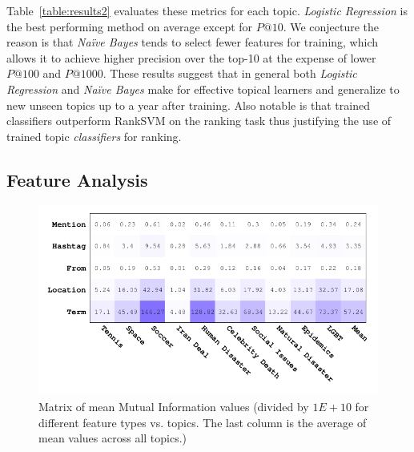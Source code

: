 \documentclass[letterpaper]{article}
\begin{document}
Table~\ref{table:results2} evaluates these metrics for each
topic. \textit{Logistic Regression} is the best performing
method on average except for $P@10$.  We conjecture the reason
is that \textit{Na\"{i}ve Bayes} tends to select fewer
features for training, which allows it to achieve higher precision
over the top-10 at the expense of lower $P@100$ and $P@1000$.
These results suggest that in general both \textit{Logistic Regression} 
and \textit{Na\"{i}ve Bayes} make for effective topical 
learners %
and generalize to new unseen topics up to a year after training.
Also notable is that 
trained classifiers outperform RankSVM on the ranking task thus justifying
the use of trained topic \emph{classifiers} for ranking.


\subsection{Feature Analysis}
\label{label:featureanalysis}
\begin{figure}[t!]
\centering
\includegraphics[width=\columnwidth]{images/avgMI.pdf}
\caption{Matrix of mean Mutual Information values (divided by $1E+10$ for different feature types vs. topics.  The last column is the average of mean values across all topics.)}
\label{fig:avgMI}
\end{figure}
\end{document}
